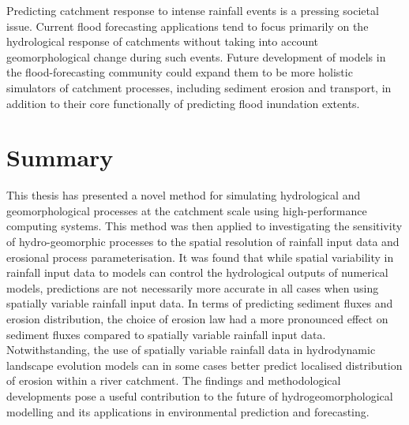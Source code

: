 Predicting catchment response to intense rainfall events is a pressing societal issue. Current flood forecasting applications tend to focus primarily on the hydrological response of catchments without taking into account geomorphological change during such events. Future development of models in the flood-forecasting community could expand them to be more holistic simulators of catchment processes, including sediment erosion and transport, in addition to their core functionally of predicting flood inundation extents. 

\section{Summary}
This thesis has presented a novel method for simulating hydrological and geomorphological processes at the catchment scale using high-performance computing systems. This method was then applied to investigating the sensitivity of hydro-geomorphic processes to the spatial resolution of rainfall input data and erosional process parameterisation. It was found that while spatial variability in rainfall input data to models can control the hydrological outputs of numerical models, predictions are not necessarily more accurate in all cases when using spatially variable rainfall input data. In terms of predicting sediment fluxes and erosion distribution, the choice of erosion law had a more pronounced effect on sediment fluxes compared to spatially variable rainfall input data. Notwithstanding, the use of spatially variable rainfall data in hydrodynamic landscape evolution models can in some cases better predict localised distribution of erosion within a river catchment. The findings and methodological developments pose a useful contribution to the future of hydrogeomorphological modelling and its applications in environmental prediction and forecasting.
